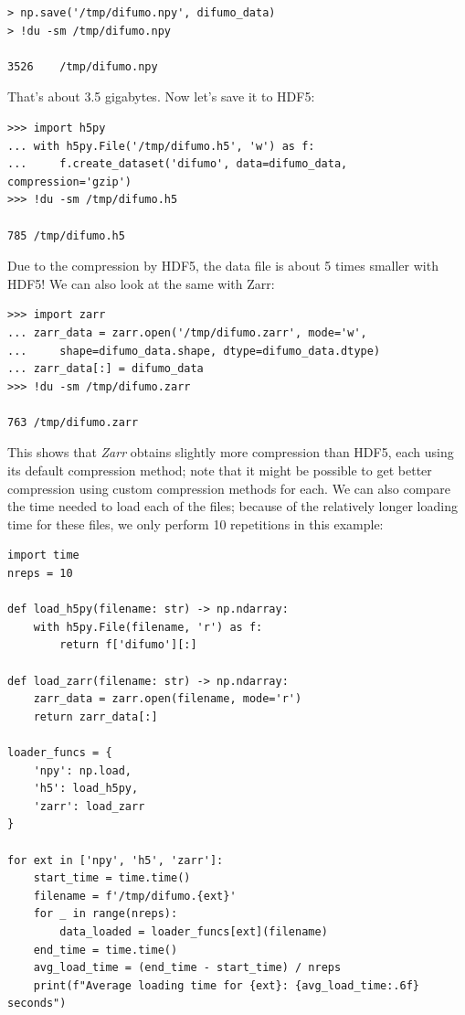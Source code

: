 \begin{lstlisting}[style=replshort]
> np.save('/tmp/difumo.npy', difumo_data)
> !du -sm /tmp/difumo.npy

3526	/tmp/difumo.npy
\end{lstlisting}

That's about 3.5 gigabytes.  Now let's save it to HDF5:

\begin{lstlisting}[style=repl]
>>> import h5py
... with h5py.File('/tmp/difumo.h5', 'w') as f:
...     f.create_dataset('difumo', data=difumo_data, compression='gzip')
>>> !du -sm /tmp/difumo.h5

785	/tmp/difumo.h5
\end{lstlisting}


Due to the compression by HDF5, the data file is about 5 times smaller with HDF5! We can also look at the same with Zarr:

\begin{lstlisting}[style=repl]
>>> import zarr
... zarr_data = zarr.open('/tmp/difumo.zarr', mode='w',
...     shape=difumo_data.shape, dtype=difumo_data.dtype)
... zarr_data[:] = difumo_data
>>> !du -sm /tmp/difumo.zarr

763	/tmp/difumo.zarr
\end{lstlisting}

This shows that \textit{Zarr} obtains slightly more compression than HDF5, each using its default compression method; note that it might be possible to get better compression using custom compression methods for each.  We can also compare the time needed to load each of the files; because of the relatively longer loading time for these files, we only perform 10 repetitions in this example:

\begin{lstlisting}[style=Python]
import time
nreps = 10

def load_h5py(filename: str) -> np.ndarray:
    with h5py.File(filename, 'r') as f:
        return f['difumo'][:]

def load_zarr(filename: str) -> np.ndarray:
    zarr_data = zarr.open(filename, mode='r')
    return zarr_data[:]

loader_funcs = {
    'npy': np.load,
    'h5': load_h5py,
    'zarr': load_zarr
}

for ext in ['npy', 'h5', 'zarr']:
    start_time = time.time()
    filename = f'/tmp/difumo.{ext}'
    for _ in range(nreps):
        data_loaded = loader_funcs[ext](filename)
    end_time = time.time()
    avg_load_time = (end_time - start_time) / nreps
    print(f"Average loading time for {ext}: {avg_load_time:.6f} seconds")
\end{lstlisting}

